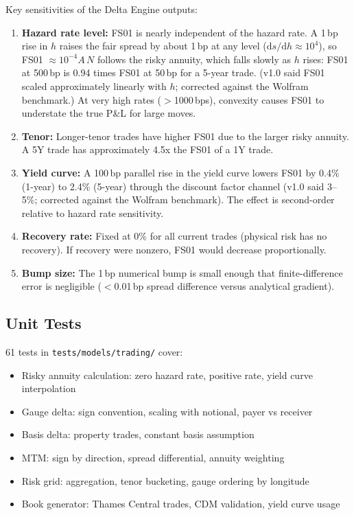 \documentclass[11pt,a4paper]{article}
\begin{document}
Key sensitivities of the Delta Engine outputs:

\begin{enumerate}
    \item \textbf{Hazard rate level:} FS01 is nearly independent of the hazard rate. A 1\,bp rise in $h$ raises the fair spread by about 1\,bp at any level ($\mathrm{d}s/\mathrm{d}h\approx10^4$), so FS01 $\approx10^{-4}A\,N$ follows the risky annuity, which falls slowly as $h$ rises: FS01 at 500\,bp is 0.94 times FS01 at 50\,bp for a 5-year trade. (v1.0 said FS01 scaled approximately linearly with $h$; corrected against the Wolfram benchmark.) At very high rates ($>$1000\,bps), convexity causes FS01 to understate the true P\&L for large moves.
    \item \textbf{Tenor:} Longer-tenor trades have higher FS01 due to the larger risky annuity. A 5Y trade has approximately 4.5x the FS01 of a 1Y trade.
    \item \textbf{Yield curve:} A 100\,bp parallel rise in the yield curve lowers FS01 by 0.4\% (1-year) to 2.4\% (5-year) through the discount factor channel (v1.0 said 3--5\%; corrected against the Wolfram benchmark). The effect is second-order relative to hazard rate sensitivity.
    \item \textbf{Recovery rate:} Fixed at 0\% for all current trades (physical risk has no recovery). If recovery were nonzero, FS01 would decrease proportionally.
    \item \textbf{Bump size:} The 1\,bp numerical bump is small enough that finite-difference error is negligible ($<$0.01\,bp spread difference versus analytical gradient).
\end{enumerate}

\clearpage

\mkmvalidation

\subsection{Unit Tests}

61 tests in \texttt{tests/models/trading/} cover:
\begin{itemize}
    \item Risky annuity calculation: zero hazard rate, positive rate, yield curve interpolation
    \item Gauge delta: sign convention, scaling with notional, payer vs receiver
    \item Basis delta: property trades, constant basis assumption
    \item MTM: sign by direction, spread differential, annuity weighting
    \item Risk grid: aggregation, tenor bucketing, gauge ordering by longitude
    \item Book generator: Thames Central trades, CDM validation, yield curve usage
\end{itemize}
\end{document}
